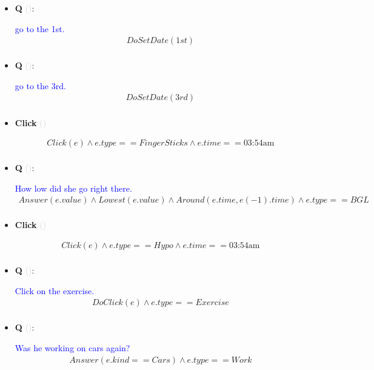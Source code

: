 \documentclass[11pt]{article}
\newcounter{CQ}
\newcounter{CClick}
\newcommand{\key}[1]{\textcolor{lightgray}{#1}}
\begin{document}
\begin{itemize}
	
	\item
	\textbf{Q\theCQ} \key{()}: \addtocounter{CQ}{1}
	\textcolor{blue}{ go to the 1st. }
	\begin{multline*}
	DoSetDate(1st) \\
	\end{multline*}
	

	
	\item
	\textbf{Q\theCQ} \key{()}: \addtocounter{CQ}{1}
	\textcolor{blue}{ go to the 3rd. }
	\begin{multline*}
	DoSetDate(3rd) \\
	\end{multline*}
	
	
	
	\item
	\textbf{Click\theCClick} \key{()} \addtocounter{CClick}{1}
	\begin{multline*}
	Click(e) \wedge e.type == FingerSticks \wedge e.time == \mbox{03:54am} \\
	\end{multline*}
	
	
	
	\item
	\textbf{Q\theCQ} \key{()}: \addtocounter{CQ}{1}
	\textcolor{blue}{ How low did she go right there. }
	\begin{multline*}
	Answer(e.value) \wedge Lowest(e.value) \wedge Around(e.time, e(-1).time) \wedge e.type==BGL \\
	\end{multline*}
	
	
	
	\item
	\textbf{Click\theCClick} \key{()} \addtocounter{CClick}{1}
	\begin{multline*}
	Click(e) \wedge e.type == Hypo \wedge e.time == \mbox{03:54am} \\
	\end{multline*}
	
	
	
	\item
	\textbf{Q\theCQ} \key{()}: \addtocounter{CQ}{1}
	\textcolor{blue}{ Click on the exercise. }
	\begin{multline*}
	DoClick(e) \wedge e.type == Exercise \\
	\end{multline*}
	

	\item
	\textbf{Q\theCQ} \key{()}: \addtocounter{CQ}{1}
	\textcolor{blue}{ Was he working on cars again? }
	\begin{multline*}
	 Answer(e.kind == Cars) \wedge e.type == Work  \\
	\end{multline*}


\end{itemize}
\end{document}
